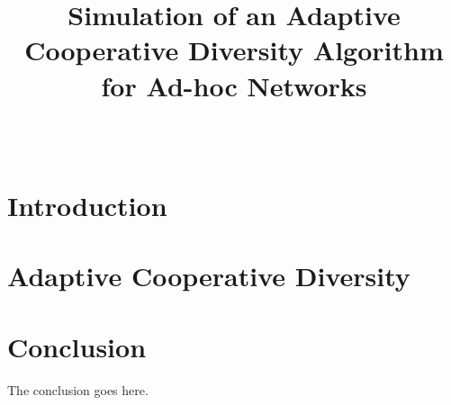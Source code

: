 \documentclass[journal]{IEEEtran}
\begin{document}
\title{Simulation of an Adaptive Cooperative Diversity Algorithm for Ad-hoc Networks}

\author{\\
}

\maketitle


\begin{abstract}

\end{abstract}

\begin{keywords}

\end{keywords}

\section{Introduction}


\section{Adaptive Cooperative Diversity}


\section{Conclusion}
The conclusion goes here.

\nocite{*}


\end{document}
